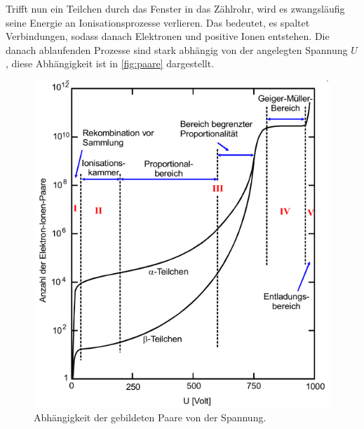 Trifft nun ein Teilchen durch das Fenster in das Zählrohr, wird es zwangsläufig seine Energie an Ionisationsprozesse verlieren.
Das bedeutet, es spaltet Verbindungen, sodass danach Elektronen und positive Ionen entstehen.
Die danach ablaufenden Prozesse sind stark abhängig von der angelegten Spannung $U$, diese Abhängigkeit ist in \autoref{fig:paare} dargestellt.

\begin{figure}
    \centering
    \includegraphics[width=\textwidth]{images/bild3.png}
    \caption{Abhängigkeit der gebildeten Paare von der Spannung.\cite{V703}}
    \label{fig:paare}
\end{figure}

